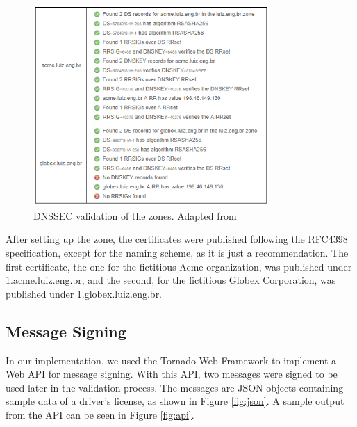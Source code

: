 \documentclass[12pt]{article}
\begin{document}
\begin{figure}[H]
    \centering
    \includegraphics[width=0.8\textwidth]{dnssecvalid.png}
    \caption{DNSSEC validation of the zones. Adapted from \cite{verisign_dnssec}}
    \label{fig:dnssecvalid}
\end{figure}

After setting up the zone, the certificates were published following the RFC4398 \cite{josefsson2006storing} specification, except for the naming scheme, as it is just a recommendation. The first certificate, the one for the fictitious Acme organization, was published under 1.acme.luiz.eng.br, and the second, for the fictitious Globex Corporation, was published under 1.globex.luiz.eng.br. 

\subsection{Message Signing}

In our implementation, we used the Tornado Web Framework \cite{python_tornadoweb} to implement a Web API for message signing. With this API, two messages were signed to be used later in the validation process. The messages are JSON objects containing sample data of a driver's license, as shown in Figure \ref{fig:json}. A sample output from the API can be seen in Figure \ref{fig:api}.
\end{document}
